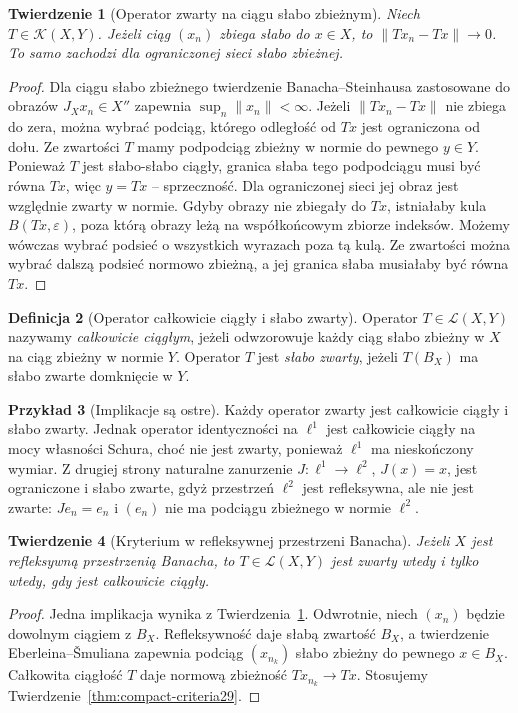 \documentclass[11pt,a4paper]{article}
\numberwithin{equation}{section}
\theoremstyle{plain}
\newtheorem{twierdzenie}{Twierdzenie}[section]
\theoremstyle{definition}
\newtheorem{definicja}[twierdzenie]{Definicja}
\newtheorem{przyklad}[twierdzenie]{Przykład}
\theoremstyle{remark}
\begin{document}
\begin{twierdzenie}[Operator zwarty na ciągu słabo zbieżnym]
\label{thm:weak-norm29}
Niech $T\in\mathcal K(X,Y)$. Jeżeli ciąg $(x_n)$ zbiega
słabo do $x\in X$, to $\|Tx_n-Tx\|\to0$.
To samo zachodzi dla \emph{ograniczonej} sieci słabo zbieżnej.
\end{twierdzenie}
\begin{proof}
Dla ciągu słabo zbieżnego twierdzenie Banacha--Steinhausa
zastosowane do obrazów $J_Xx_n\in X''$ zapewnia
$\sup_n\|x_n\|<\infty$. Jeżeli $\|Tx_n-Tx\|$ nie zbiega
do zera, można wybrać podciąg, którego odległość od $Tx$
jest ograniczona od dołu. Ze zwartości $T$ mamy podpodciąg
zbieżny w normie do pewnego $y\in Y$. Ponieważ $T$
jest słabo-słabo ciągły, granica słaba tego podpodciągu
musi być równa $Tx$, więc $y=Tx$ -- sprzeczność.
Dla ograniczonej sieci jej obraz jest względnie zwarty
w normie. Gdyby obrazy nie zbiegały do $Tx$, istniałaby
kula $B(Tx,\varepsilon)$, poza którą obrazy leżą
na współkońcowym zbiorze indeksów. Możemy wówczas
wybrać podsieć o wszystkich wyrazach poza tą kulą.
Ze zwartości można wybrać dalszą podsieć normowo zbieżną,
a jej granica słaba musiałaby być równa $Tx$.
\end{proof}

\begin{definicja}[Operator całkowicie ciągły i słabo zwarty]
\label{def:completely-continuous29}
Operator $T\in\mathcal L(X,Y)$ nazywamy
\emph{całkowicie ciągłym}, jeżeli odwzorowuje każdy ciąg
słabo zbieżny w $X$ na ciąg zbieżny w normie $Y$.
Operator $T$ jest \emph{słabo zwarty}, jeżeli
$T(B_X)$ ma słabo zwarte domknięcie w $Y$.
\end{definicja}

\begin{przyklad}[Implikacje są ostre]
\label{ex:weak-vs-compact29}
Każdy operator zwarty jest całkowicie ciągły i słabo zwarty.
Jednak operator identyczności na $\ell^1$ jest całkowicie
ciągły na mocy własności Schura, choć nie jest zwarty,
ponieważ $\ell^1$ ma nieskończony wymiar.
Z drugiej strony naturalne zanurzenie
$J:\ell^1\to\ell^2$, $J(x)=x$, jest ograniczone
i słabo zwarte, gdyż przestrzeń $\ell^2$ jest refleksywna,
ale nie jest zwarte: $Je_n=e_n$ i $(e_n)$ nie ma
podciągu zbieżnego w normie $\ell^2$.
\end{przyklad}

\begin{twierdzenie}[Kryterium w refleksywnej przestrzeni Banacha]
\label{thm:reflexive-complete-cont29}
Jeżeli $X$ jest refleksywną przestrzenią Banacha, to
$T\in\mathcal L(X,Y)$ jest zwarty wtedy i tylko wtedy,
gdy jest całkowicie ciągły.
\end{twierdzenie}
\begin{proof}
Jedna implikacja wynika z
Twierdzenia~\ref{thm:weak-norm29}. Odwrotnie,
niech $(x_n)$ będzie dowolnym ciągiem z $B_X$.
Refleksywność daje słabą zwartość $B_X$, a twierdzenie
Eberleina--\v Smuliana zapewnia podciąg $(x_{n_k})$
słabo zbieżny do pewnego $x\in B_X$.
Całkowita ciągłość $T$ daje normową zbieżność
$Tx_{n_k}\to Tx$. Stosujemy
Twierdzenie~\ref{thm:compact-criteria29}.
\end{proof}
\end{document}
